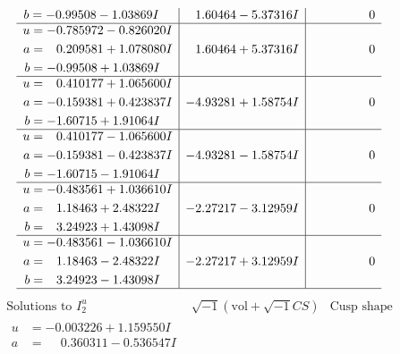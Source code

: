 \documentclass[1p]{elsarticle_modified}
\theoremstyle{definition}
\newcommand{\I}{\sqrt{-1}}
\begin{document}
$$\begin{array}{c|c|c}
\begin{aligned}
b &= -0.99508 - 1.03869 I\end{aligned}
 & \phantom{-}1.60464 - 5.37316 I & \phantom{-0.000000 } 0 \\ \hline\begin{aligned}
u &= -0.785972 - 0.826020 I \\
a &= \phantom{-}0.209581 + 1.078080 I \\
b &= -0.99508 + 1.03869 I\end{aligned}
 & \phantom{-}1.60464 + 5.37316 I & \phantom{-0.000000 } 0 \\ \hline\begin{aligned}
u &= \phantom{-}0.410177 + 1.065600 I \\
a &= -0.159381 + 0.423837 I \\
b &= -1.60715 + 1.91064 I\end{aligned}
 & -4.93281 + 1.58754 I & \phantom{-0.000000 } 0 \\ \hline\begin{aligned}
u &= \phantom{-}0.410177 - 1.065600 I \\
a &= -0.159381 - 0.423837 I \\
b &= -1.60715 - 1.91064 I\end{aligned}
 & -4.93281 - 1.58754 I & \phantom{-0.000000 } 0 \\ \hline\begin{aligned}
u &= -0.483561 + 1.036610 I \\
a &= \phantom{-}1.18463 + 2.48322 I \\
b &= \phantom{-}3.24923 + 1.43098 I\end{aligned}
 & -2.27217 - 3.12959 I & \phantom{-0.000000 } 0 \\ \hline\begin{aligned}
u &= -0.483561 - 1.036610 I \\
a &= \phantom{-}1.18463 - 2.48322 I \\
b &= \phantom{-}3.24923 - 1.43098 I\end{aligned}
 & -2.27217 + 3.12959 I & \phantom{-0.000000 } 0\\
 \hline 
 \end{array}$$\newpage$$\begin{array}{c|c|c}  
\text{Solutions to }I^u_{2}& \I (\text{vol} + \sqrt{-1}CS) & \text{Cusp shape}\\
 \hline 
\begin{aligned}
u &= -0.003226 + 1.159550 I \\
a &= \phantom{-}0.360311 - 0.536547 I \\

\end{aligned}
\end{array}$$
\end{document}
